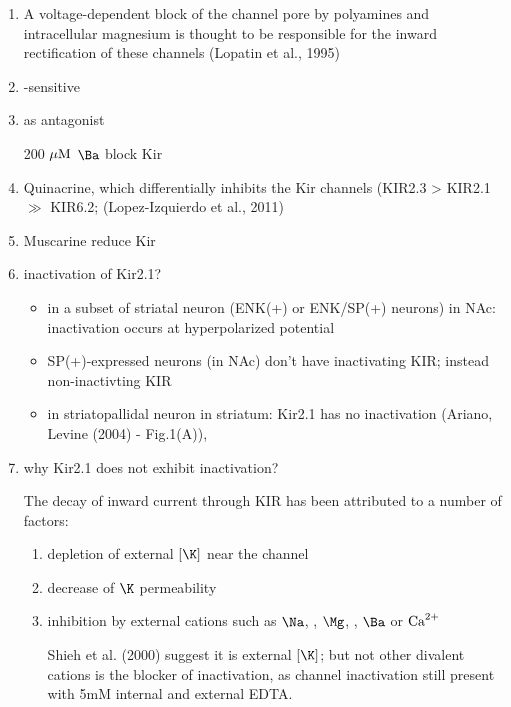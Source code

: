 \begin{enumerate}
  \item  A voltage-dependent block of the channel pore by polyamines and
  intracellular magnesium is thought to be responsible for the inward
  rectification of these channels (Lopatin et al., 1995) 
  
  \item {}-sensitive
  
  \item {} as antagonist
  
  200 ${\mu\text{M}}$ $\Ba$ block Kir
  
  \item Quinacrine, which differentially inhibits the Kir channels (KIR2.3 >
  KIR2.1 $\gg$ KIR6.2; (Lopez-Izquierdo et al., 2011)

  \item Muscarine reduce Kir 
   
  \item  inactivation of Kir2.1?
  \begin{itemize}
    \item in a subset of striatal neuron (ENK(+) or ENK/SP(+) neurons) in NAc: 
    inactivation occurs at hyperpolarized potential
    
    \item SP(+)-expressed neurons (in NAc) don't have inactivating KIR; instead
    non-inactivting KIR
    
    \item in striatopallidal neuron in striatum: Kir2.1 has no inactivation
    (Ariano, Levine (2004) - Fig.1(A)), 
    
  \end{itemize}
  
  \item why Kir2.1 does not exhibit inactivation?
  
  The decay of inward current through KIR has been attributed to
  a number of factors:
  \begin{enumerate}
    \item depletion of external $[\K]$ near the channel
    
    \item decrease of $\K$ permeability
    
    \item inhibition by external cations such as $\Na$, , $\Mg$,
    , $\Ba$ or ${\text{Ca}^{2+}}$
    
 Shieh et al. (2000) suggest it is external $[\K]$; but not other divalent
 cations is the blocker of inactivation, as channel inactivation still present
 with 5mM internal and external EDTA.
 

\end{enumerate}
\end{enumerate}

